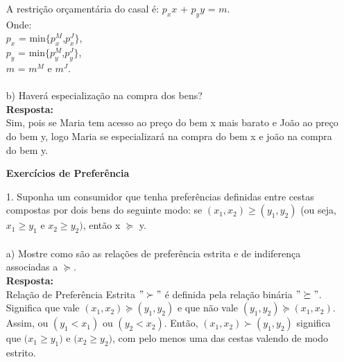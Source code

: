 \begin{enumerate}
A restrição orçamentária do casal é: {$p_{x}x$} + {$p_{y}y$} = $m$.\\

Onde:\\
$p_{x}$ = min{$\lbrace$}{$p^M_x$},{$p^J_x$}{$\rbrace$},\\
$p_{y}$ = min{$\lbrace$}{$p^M_y$},{$p^J_y$}{$\rbrace$},\\
{$m$} = {$m^M$} e {$m^J$}.\\

\paragraph{} b) Haverá especialização na compra dos bens?\\

\textbf{Resposta:}\\

Sim, pois se Maria tem acesso ao preço do bem x mais barato e João ao preço do bem y, logo Maria se especializará na compra do bem x e joão na compra do bem y.\\

\newpage

\begin{center}
\textbf{Exercícios de Preferência}\\
\end{center}

\item[1.] Suponha um consumidor que tenha preferências definidas entre cestas compostas por dois bens do seguinte modo: se {$(x_{1},x_{2})$}{$\geq$}{$(y_{1},y_{2})$} (ou seja, {$x_{1}$}{$\geq$}{$y_{1}$} e {$x_{2}$}{$\geq$}{$y_{2})$}, então x {$\succeq$} y.\\

\paragraph{}a) Mostre como são as relações de preferência estrita e de indiferença associadas a {$\succeq$}.\\

\textbf{Resposta:}\\
 
Relação de Preferência Estrita {$"\succ"$} é definida pela relação binária {$"\succeq"$}. Significa que vale {$(x_{1},x_{2})$}{$\succeq$}{$(y_{1},y_{2})$} e que não vale {$(y_{1},y_{2})$}{$\succeq$}{$(x_{1},x_{2})$}.  Assim, ou {$(y_{1}<x_{1})$} ou {$(y_{2}<x_{2})$}. Então, {$(x_{1},x_{2})$}{$\succ$}{$(y_{1},y_{2})$} significa que {$(x_{1}$}{$\geq$}{$y_{1})$} e {$(x_{2}$}{$\geq$}{$y_{2})$}, com pelo menos uma das cestas valendo de modo estrito.\\


\end{enumerate}

